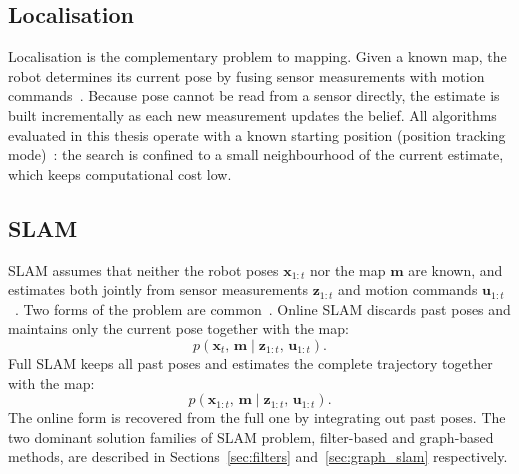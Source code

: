 \subsection{Localisation}

Localisation is the complementary problem to mapping. Given a known map, the
robot determines its current pose by fusing sensor measurements with motion
commands~\cite[p.~157]{thrun2005probabilistic}.
Because pose cannot be read from a sensor directly, the estimate is built
incrementally as each new measurement updates the belief.
All algorithms evaluated in this thesis operate with a known starting position
(position tracking mode)~\cite[p.~159]{thrun2005probabilistic}: the search
is confined to a small neighbourhood of the current estimate, which keeps
computational cost low.

\subsection{SLAM}

SLAM assumes that neither the robot poses $\mathbf{x}_{1:t}$ nor the map $\mathbf{m}$
are known, and estimates both jointly from sensor measurements $\mathbf{z}_{1:t}$
and motion commands $\mathbf{u}_{1:t}$~\cite[p.~245]{thrun2005probabilistic}.
Two forms of the problem are common~\cite[pp.~245 and~246]{thrun2005probabilistic}.
Online SLAM discards past poses and maintains only the current pose together with the map:
\begin{equation}
  p(\mathbf{x}_t,\, \mathbf{m} \mid \mathbf{z}_{1:t},\, \mathbf{u}_{1:t}).
  \label{eq:slam_online}
\end{equation}
Full SLAM keeps all past poses and estimates the complete trajectory together with the map:
\begin{equation}
  p(\mathbf{x}_{1:t},\, \mathbf{m} \mid \mathbf{z}_{1:t},\, \mathbf{u}_{1:t}).
  \label{eq:slam_full}
\end{equation}
The online form is recovered from the full one by integrating out past poses.
The two dominant solution families of SLAM problem, filter-based and graph-based methods, are
described in Sections~\ref{sec:filters} and~\ref{sec:graph_slam} respectively.

